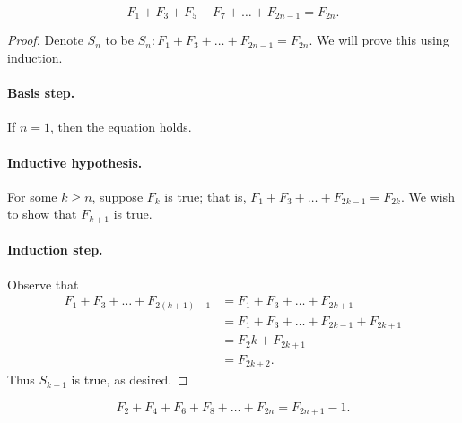 \documentclass{exam}
\begin{document}
\begin{proposition}{10.27}
    $$F_1 + F_3 + F_5 + F_7 +\dots+ F_{2n-1} = F_{2n}.$$
\end{proposition}

\begin{proof}
    Denote $S_n$ to be $S_n:F_1+F_3+\dots+F_{2n-1}=F_{2n}$. We will prove this using induction.

    \paragraph{Basis step.} If $n =1$, then the equation holds.

    \paragraph{Inductive hypothesis.} For some $k\ge n$, suppose $F_k$ is true; that is, $F_1+F_3+\dots+F_{2k-1}=F_{2k}$. We wish to show that $F_{k+1}$ is true.

    \paragraph{Induction step.} Observe that
    \begin{align*}
        F_1+F_3+\dots+F_{2(k+1)-1} &= F_1+F_3+\dots+F_{2k+1}\\
        &=F_1+F_3+\dots+F_{2k-1}+F_{2k+1}\\
        &=F_2k + F_{2k + 1}\\
        &=F_{2k + 2}.
    \end{align*}
    Thus $S_{k+1}$ is true, as desired.
\end{proof}

\begin{proposition}{10.28}
    $$F_2+F_4+F_6+F_8+\dots+F_{2n}=F_{2n+1}-1.$$
\end{proposition}
\end{document}
